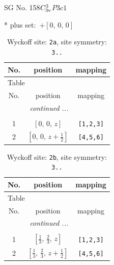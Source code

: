 \documentclass[fleqn,8pt]{jsarticle}
\begin{document}
\setcounter{MaxMatrixCols}{32}

\renewcommand{\tablename}{Table~}
\renewcommand{\figurename}{Figure~}
\begin{center}
\LARGE
SG No. 158\quad$C_{\rm 3v}^{3}$\quad$P3c1$\quad[ trigonal ]
\end{center}
* plus set:\,\,\,$+\left[ 0,\, 0,\, 0 \right]$
\renewcommand{\arraystretch}{1.2}
\begin{longtable}{ccc}
\caption{Wyckoff site: {\tt 2a}, site symmetry: {\tt 3..}}
 \\
 \hline \hline
No. & position & mapping \\ \hline \endfirsthead

\multicolumn{2}{l}{\tablename\ \thetable{}} \\
 \hline \hline
No. & position & mapping \\ \hline \endhead

 \hline \hline
\multicolumn{2}{r}{\footnotesize\it continued ...} \\ \endfoot

 \hline \hline
\multicolumn{2}{r}{} \\ \endlastfoot

1 & $\left[ 0,\, 0,\, z \right]$ & {\tt [1,2,3]} \\ \hline
2 & $\left[ 0,\, 0,\, z + \frac{1}{2} \right]$ & {\tt [4,5,6]} \\
\end{longtable}
\renewcommand{\arraystretch}{1.2}
\begin{longtable}{ccc}
\caption{Wyckoff site: {\tt 2b}, site symmetry: {\tt 3..}}
 \\
 \hline \hline
No. & position & mapping \\ \hline \endfirsthead

\multicolumn{2}{l}{\tablename\ \thetable{}} \\
 \hline \hline
No. & position & mapping \\ \hline \endhead

 \hline \hline
\multicolumn{2}{r}{\footnotesize\it continued ...} \\ \endfoot

 \hline \hline
\multicolumn{2}{r}{} \\ \endlastfoot

1 & $\left[ \frac{1}{3},\, \frac{2}{3},\, z \right]$ & {\tt [1,2,3]} \\ \hline
2 & $\left[ \frac{1}{3},\, \frac{2}{3},\, z + \frac{1}{2} \right]$ & {\tt [4,5,6]} \\
\end{longtable}
\end{document}
